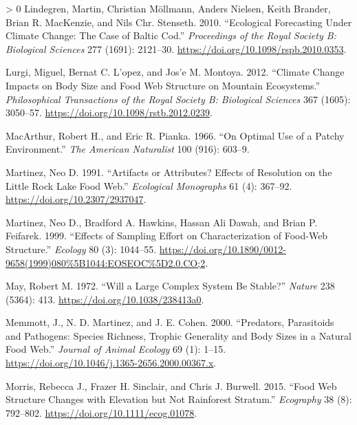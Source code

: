 \documentclass{article}
\newlength{\cslhangindent}
\newenvironment{CSLReferences}[3] %
 {%
  \setlength{\parindent}{0pt}
  \ifodd #1 \everypar{\setlength{\hangindent}{\cslhangindent}}\ignorespaces\fi
  \ifnum #2 > 0
  \setlength{\parskip}{#2\baselineskip}
  \fi
 }%
 {}
\begin{document}
\begin{CSLReferences}{1}{0}
\leavevmode\hypertarget{ref-lindegrenEcologicalForecastingClimate2010}{}%
Lindegren, Martin, Christian Möllmann, Anders Nielsen, Keith Brander,
Brian R. MacKenzie, and Nils Chr. Stenseth. 2010. {``Ecological
Forecasting Under Climate Change: The Case of {Baltic} Cod.''}
\emph{Proceedings of the Royal Society B: Biological Sciences} 277
(1691): 2121--30. \url{https://doi.org/10.1098/rspb.2010.0353}.

\leavevmode\hypertarget{ref-lurgiClimateChangeImpacts2012}{}%
Lurgi, Miguel, Bernat C. L'opez, and Jos'e M. Montoya. 2012. {``Climate
Change Impacts on Body Size and Food Web Structure on Mountain
Ecosystems.''} \emph{Philosophical Transactions of the Royal Society B:
Biological Sciences} 367 (1605): 3050--57.
\url{https://doi.org/10.1098/rstb.2012.0239}.

\leavevmode\hypertarget{ref-macarthurOptimalUsePatchy1966}{}%
MacArthur, Robert H., and Eric R. Pianka. 1966. {``On {Optimal Use} of a
{Patchy Environment}.''} \emph{The American Naturalist} 100 (916):
603--9.

\leavevmode\hypertarget{ref-martinezArtifactsAttributesEffects1991}{}%
Martinez, Neo D. 1991. {``Artifacts or {Attributes}? {Effects} of
{Resolution} on the {Little Rock Lake Food Web}.''} \emph{Ecological
Monographs} 61 (4): 367--92. \url{https://doi.org/10.2307/2937047}.

\leavevmode\hypertarget{ref-martinezEffectsSamplingEffort1999}{}%
Martinez, Neo D., Bradford A. Hawkins, Hassan Ali Dawah, and Brian P.
Feifarek. 1999. {``Effects of {Sampling Effort} on {Characterization} of
{Food}-{Web Structure}.''} \emph{Ecology} 80 (3): 1044--55.
\url{https://doi.org/10.1890/0012-9658(1999)080\%5B1044:EOSEOC\%5D2.0.CO;2}.

\leavevmode\hypertarget{ref-mayWillLargeComplex1972}{}%
May, Robert M. 1972. {``Will a {Large Complex System} Be {Stable}?''}
\emph{Nature} 238 (5364): 413. \url{https://doi.org/10.1038/238413a0}.

\leavevmode\hypertarget{ref-memmottPredatorsParasitoidsPathogens2000}{}%
Memmott, J., N. D. Martinez, and J. E. Cohen. 2000. {``Predators,
Parasitoids and Pathogens: Species Richness, Trophic Generality and Body
Sizes in a Natural Food Web.''} \emph{Journal of Animal Ecology} 69 (1):
1--15. \url{https://doi.org/10.1046/j.1365-2656.2000.00367.x}.

\leavevmode\hypertarget{ref-morrisFoodWebStructure2015}{}%
Morris, Rebecca J., Frazer H. Sinclair, and Chris J. Burwell. 2015.
{``Food Web Structure Changes with Elevation but Not Rainforest
Stratum.''} \emph{Ecography} 38 (8): 792--802.
\url{https://doi.org/10.1111/ecog.01078}.


\end{CSLReferences}
\end{document}
